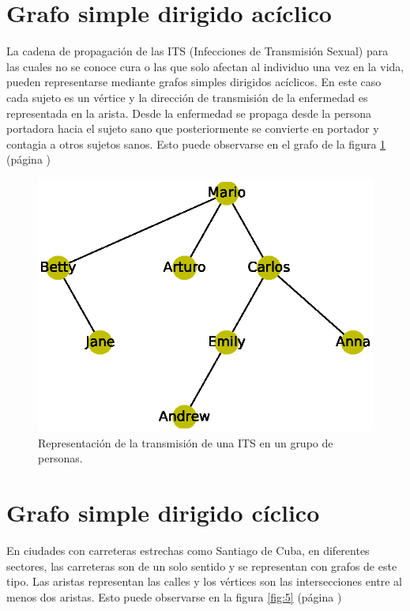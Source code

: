 \documentclass{article}
\begin{document}
\section{Grafo simple dirigido acíclico}

La cadena de propagación de las ITS (Infecciones de Transmisión Sexual) para las cuales no se conoce cura o las que solo afectan al individuo una vez en la vida, pueden representarse mediante grafos simples dirigidos acíclicos. En este caso cada sujeto es un vértice y la dirección de transmisión de la enfermedad es representada en la arista. Desde la enfermedad se propaga desde la persona portadora hacia el sujeto sano que posteriormente se convierte en portador y contagia a otros sujetos sanos.
Esto puede observarse en el grafo de la figura \ref{fig:4} (página \pageref{fig:4})


\begin{figure}
  \includegraphics[width=.8\columnwidth]{4.eps}
  \vspace*{-8mm}
  \caption{Representación de la transmisión de una ITS en un grupo de personas.}
  \label{fig:4}
\end{figure}

\section{Grafo simple dirigido cíclico}

En ciudades con carreteras estrechas como Santiago de Cuba, en diferentes sectores, las carreteras son de un solo sentido y se representan con grafos de este tipo. Las aristas representan las calles y los vértices son las intersecciones entre al menos dos aristas. Esto puede observarse en la figura \ref{fig:5} (página \pageref{fig:5})
\end{document}
